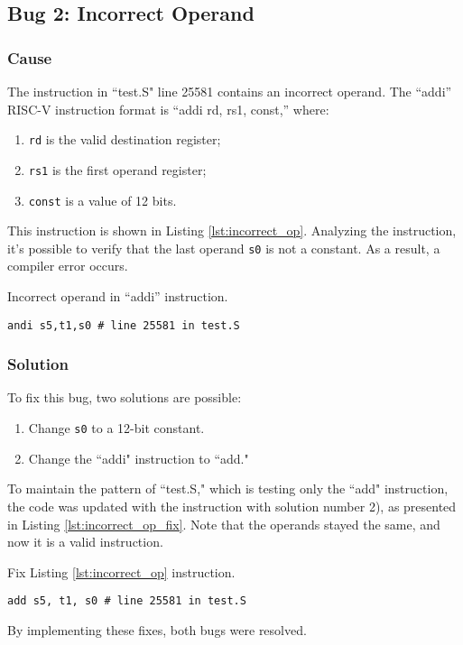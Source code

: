 \subsection{Bug 2: Incorrect Operand}

\subsubsection{Cause}

The instruction in ``test.S" line 25581 contains an incorrect operand. The ``addi'' RISC-V instruction format is ``addi rd, rs1, const,'' where:

\begin{enumerate}
    \item \texttt{rd} is the valid destination register;
    \item \texttt{rs1} is the first operand register;
    \item \texttt{const} is a value of 12 bits.
\end{enumerate}

This instruction is shown in Listing \ref{lst:incorrect_op}. Analyzing the instruction, it's possible to verify that the last operand \texttt{s0} is not a constant. As a result, a compiler error occurs.

\begin{listing}[h]
\caption{Incorrect operand in ``addi'' instruction.}
\label{lst:incorrect_op}
\begin{verbatim}
andi s5,t1,s0 # line 25581 in test.S
\end{verbatim}
\end{listing}

\subsubsection{Solution}

To fix this bug, two solutions are possible:

\begin{enumerate}
 \item Change \texttt{s0} to a 12-bit constant.
 \item Change the ``addi" instruction to ``add."
\end{enumerate}

To maintain the pattern of ``test.S," which is testing only the ``add" instruction, the code was updated with the instruction with solution number 2), as presented in Listing \ref{lst:incorrect_op_fix}. Note that the operands stayed the same, and now it is a valid instruction.

\begin{listing}[h]
\caption{Fix Listing \ref{lst:incorrect_op} instruction.}
\label{lst:incorrect_op_fix}
\begin{verbatim}
add s5, t1, s0 # line 25581 in test.S
\end{verbatim}
\end{listing}

By implementing these fixes, both bugs were resolved.

